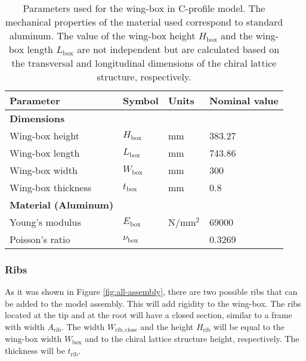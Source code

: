 \begin{table}[!htpb]
\centering
\begin{tabular}{|l|lll|}
\hline
\textbf{Parameter} & \multicolumn{1}{l|}{\textbf{Symbol}} & \multicolumn{1}{l|}{\textbf{Units}} & \textbf{Nominal value} \\ \hline \hline
{\textbf{Dimensions}} &  &  &  \\ \hline
Wing-box height & \multicolumn{1}{l|}{$H_{\mathrm{box}}$} & \multicolumn{1}{l|}{mm} & 383.27 \\ \hline
Wing-box length & \multicolumn{1}{l|}{$L_{\mathrm{box}}$} & \multicolumn{1}{l|}{mm} & 743.86 \\ \hline
Wing-box width & \multicolumn{1}{l|}{$W_{\mathrm{box}}$} & \multicolumn{1}{l|}{mm} & 300 \\ \hline
Wing-box thickness & \multicolumn{1}{l|}{$t_{\mathrm{box}}$} & \multicolumn{1}{l|}{mm} & 0.8 \\ \hline \hline
{\textbf{Material (Aluminum)}} &  &  &  \\ \hline
Young's modulus & \multicolumn{1}{l|}{$E_{\mathrm{box}}$} & \multicolumn{1}{l|}{N/mm$^2$} & 69000 \\ \hline
Poisson's ratio & \multicolumn{1}{l|}{$\nu_{\mathrm{box}}$} & \multicolumn{1}{l|}{} & 0.3269 \\ \hline
\end{tabular}
\caption[Parameters used for the wing-box in C-profile model]{Parameters used for the wing-box in C-profile model. The mechanical properties of the material used correspond to standard aluminum. The value of the wing-box height $H_{\mathrm{box}}$ and the wing-box length $L_{\mathrm{box}}$ are not independent but are calculated based on the transversal and longitudinal dimensions of the chiral lattice structure, respectively.}
\label{tab:parameters_wing-box}
\end{table}

\clearpage
\subsubsection{Ribs} \label{subsubsec:Ribs_Parametrization}

As it was shown in Figure \ref{fig:all-assembly}, there are two possible ribs that can be added to the model assembly. This will add rigidity to the wing-box. The ribs located at the tip and at the root will have a closed section, similar to a frame with width $A_{\mathrm{rib}}$. The width $W_{\mathrm{rib,close}}$ and the height $H_{\mathrm{rib}}$ will be equal to the wing-box width $W_{\mathrm{box}}$ and to the chiral lattice structure height, respectively. The thickness will be $t_{\mathrm{rib}}$.


